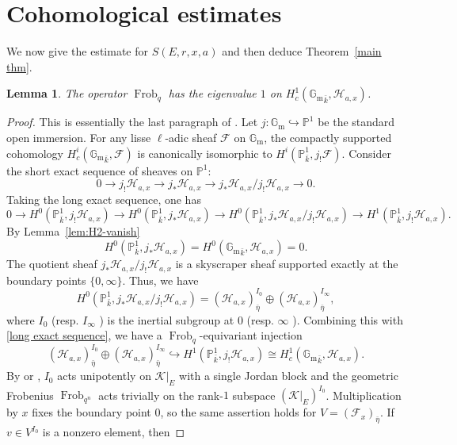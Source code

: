 \documentclass[11pt]{amsart}
\newtheorem{lemma}[theorem]{Lemma}
\theoremstyle{remark}
\newcommand{\Gm}{\mathbb G_{\mathrm m}}
\newcommand{\Pj}{\mathbb P}
\newcommand{\Frob}{\operatorname{Frob}}
\newcommand{\cF}{\mathcal F}
\newcommand{\cK}{\mathcal K}
\newcommand{\cH}{\mathcal H}
\begin{document}
\section{Cohomological estimates}\label{sec:cohomological-estimates}

We now give the estimate for $S(E,r,x,a)$ and then deduce Theorem~\ref{main thm}.

\begin{lemma}\label{engenvalue 1}
The operator $\Frob_q$ has the eigenvalue $1$ on $H_c^1({\Gm}_{\bar{k}},\cH_{a,x})$.
\end{lemma}
\begin{proof}
This is essentially the last paragraph of \cite[Section 3]{LinWanEtale}. Let $j: \Gm \hookrightarrow \Pj^1$ be the standard open immersion. For any lisse $\ell$-adic sheaf $\cF$ on $\Gm$, the compactly supported cohomology $H^i_c({\Gm}_{\bar{k}}, \cF)$ is canonically isomorphic to $H^i(\Pj^1_{\bar{k}}, j_! \cF)$. Consider the short exact sequence of sheaves on $\Pj^1$:
\[
 0 \longrightarrow j_! \cH_{a,x} \longrightarrow j_* \cH_{a,x} \longrightarrow j_* \cH_{a,x} / j_! \cH_{a,x} \longrightarrow 0.
\]
Taking the long exact sequence, one has
\begin{equation}\label{long exact sequence}
     0 \longrightarrow H^0(\Pj^1_{\bar{k}}, j_! \cH_{a,x}) \longrightarrow H^0(\Pj^1_{\bar{k}}, j_* \cH_{a,x}) \longrightarrow H^0(\Pj^1_{\bar{k}}, j_* \cH_{a,x} / j_! \cH_{a,x}) \longrightarrow H^1(\Pj^1_{\bar{k}}, j_! \cH_{a,x}).
\end{equation}
By Lemma~\ref{lem:H2-vanish}
\[
H^0(\Pj^1_{\bar{k}}, j_* \cH_{a,x})=H^0({\Gm}_{\bar{k}}, \cH_{a,x})=0.
\]
The quotient sheaf $j_* \cH_{a,x} / j_! \cH_{a,x}$ is a skyscraper sheaf supported exactly at the boundary points $\{0, \infty\}$. Thus, we have 
\[
H^0(\Pj^1_{\bar{k}}, j_* \cH_{a,x} / j_! \cH_{a,x})=(\cH_{a,x})_{\bar{\eta}}^{I_0}\oplus(\cH_{a,x})_{\bar{\eta}}^{I_\infty},
\]
where $I_0$ (resp. $I_\infty$ ) is the inertial subgroup at $0$ (resp. $\infty$ ). Combining this with \eqref{long exact sequence}, we have a $\Frob_q$-equivariant injection
\begin{equation} \label{eq:injection}
(\cH_{a,x})_{\bar{\eta}}^{I_0}\oplus(\cH_{a,x})_{\bar{\eta}}^{I_\infty}\hookrightarrow H^1(\Pj^1_{\bar{k}}, j_! \cH_{a,x})\cong H^1_c({\Gm}_{\bar{k}}, \cH_{a,x}). 
\end{equation}
By \cite[Theorem 7.8]{SGA45} or \cite[Theorem 7.4.3]{KatzGKM}, $I_0$ acts unipotently on $\cK|_E$ with a single Jordan block and the geometric Frobenius $\Frob_{q^n}$ acts trivially on the rank-$1$ subspace $(\cK|_E)^{I_0}$. Multiplication by $x$ fixes the boundary point $0$, so the same assertion holds for $V=(\cF_x)_{\bar\eta}$. If $v\in V^{I_0}$ is a nonzero element, then 

\end{proof}
\end{document}
